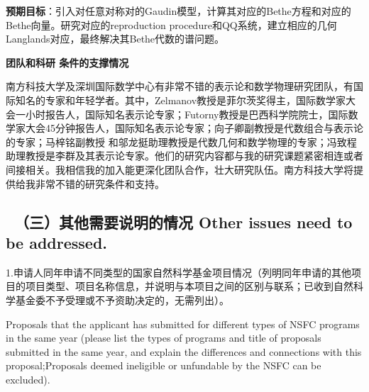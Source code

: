 \documentclass[12pt,UTF8,AutoFakeBold=4,a4paper]{ctexart}
\begin{document}
\textbf{预期目标}：引入对任意对称对的Gaudin模型，计算其对应的Bethe方程和对应的Bethe向量。研究对应的reproduction procedure和QQ系统，建立相应的几何Langlands对应，最终解决其Bethe代数的谱问题。







\medskip

\textbf{\sihao 团队和科研 条件的支撑情况}

南方科技大学及深圳国际数学中心有非常不错的表示论和数学物理研究团队，有国际知名的专家和年轻学者。其中，Zelmanov教授是菲尔茨奖得主，国际数学家大会一小时报告人，国际知名表示论专家；Futorny教授是巴西科学院院士，国际数学家大会45分钟报告人，国际知名表示论专家；向子卿副教授是代数组合与表示论的专家；马梓铭副教授 和邬龙挺助理教授是代数几何和数学物理的专家；冯致程助理教授是李群及其表示论专家。他们的研究内容都与我的研究课题紧密相连或者间接相关。我相信我的加入能更深化团队合作，壮大研究队伍。南方科技大学将提供给我非常不错的研究条件和支持。

\bigskip

{\color{MsBlue} \subsection{\sihao \kaishu \qquad \ \bfseries（三）其他需要说明的情况 
\xiaosihao {} Other issues need to be addressed.}}
%

\bigskip

{\sihao \color{MsBlue} \kaishu 1.申请人同年申请不同类型的国家自然科学基金项目情况（列明同年申请的其他项目的项目类型、项目名称信息，并说明与本项目之间的区别与联系；已收到自然科学基金委不予受理或不予资助决定的，无需列出）。}

\bigskip

{\color{MsBlue} \xiaosihao {} 
Proposals that the applicant has submitted for different types of NSFC programs in the same year (please list the types of programs and title of proposals submitted in the same year, and explain the differences and connections with this proposal;Proposals deemed ineligible or unfundable by the NSFC can be excluded).}
\end{document}
